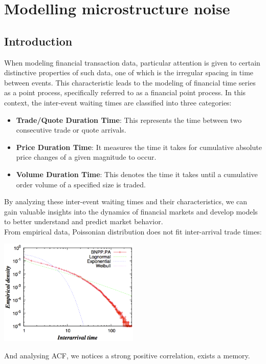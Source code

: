 \chapter{Modelling microstructure noise}
\label{chap:modelling_microstructure_noise}
\section{Introduction}
When modeling financial transaction data, particular attention is given to certain distinctive properties of such data, one of which is the irregular spacing in time between events. This characteristic leads to the modeling of financial time series as a point process, specifically referred to as a financial point process. In this context, the inter-event waiting times are classified into three categories:
\begin{itemize}
	\item \textbf{Trade/Quote Duration Time}: This represents the time between two consecutive trade or quote arrivals.
	
	\item \textbf{Price Duration Time}: It measures the time it takes for cumulative absolute price changes of a given magnitude to occur.
	
	\item \textbf{Volume Duration Time}: This denotes the time it takes until a cumulative order volume of a specified size is traded.
\end{itemize}
By analyzing these inter-event waiting times and their characteristics, we can gain valuable insights into the dynamics of financial markets and develop models to better understand and predict market behavior.\\
From empirical data, Poissonian distribution does not fit inter-arrival trade times:
\begin{center}
	\includegraphics[width=0.5\textwidth]{picture/(39)interarrival_trade_times.png}
\end{center}
And analysing ACF, we notices a strong positive correlation, exists a memory.
